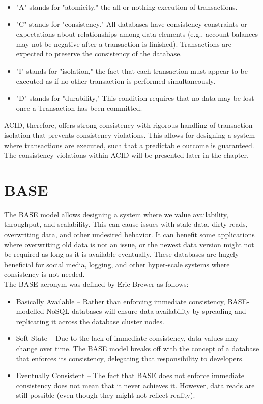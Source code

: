 \documentclass[a4paper,10pt,titlepage]{report}
\begin{document}
    \begin{itemize}
        \item "A" stands for "atomicity," the all-or-nothing execution of transactions.
        \item "C" stands for "consistency." All databases have consistency constraints or expectations about relationships among data elements (e.g., account balances may not be negative after a transaction is finished). Transactions are expected to preserve the consistency of the database.
        \item "I" stands for "isolation," the fact that each transaction must appear to be executed as if no other transaction is performed simultaneously.
        \item "D" stands for "durability," This condition requires that no data may be lost once a Transaction has been committed.
    \end{itemize}

    ACID, therefore, offers strong consistency with rigorous handling of transaction isolation that prevents consistency violations. This allows for designing a system where transactions are executed, such that a predictable outcome is guaranteed. The consistency violations within ACID will be presented later in the chapter.



    \section{BASE}
    The BASE model allows designing a system where we value availability, throughput, and scalability. This can cause issues with stale data, dirty reads, overwriting data, and other undesired behavior. It can benefit some applications where overwriting old data is not an issue, or the newest data version might not be required as long as it is available eventually. These databases are hugely beneficial for social media, logging, and other hyper-scale systems where consistency is not needed.\\
    \newpage
    The BASE acronym was defined by Eric Brewer \cite{brewer2000towards} as follows:

    \begin{itemize}
        \item Basically Available – Rather than enforcing immediate consistency, BASE-modelled NoSQL databases will ensure data availability by spreading and replicating it across the database cluster nodes.
        \item Soft State – Due to the lack of immediate consistency, data values may change over time. The BASE model breaks off with the concept of a database that enforces its consistency, delegating that responsibility to developers.
        \item Eventually Consistent – The fact that BASE does not enforce immediate consistency does not mean that it never achieves it. However, data reads are still possible (even though they might not reflect reality).
    \end{itemize}
\end{document}
